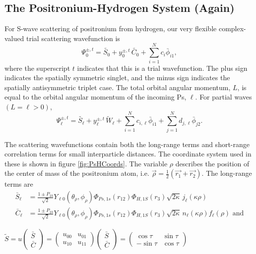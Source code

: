 \documentclass[preprint,showpacs,preprintnumbers,amsmath,amssymb]{revtex4}
\begin{document}
\subsection{The Positronium-Hydrogen System (Again)}
For S-wave scattering of positronium from hydrogen, our very flexible complex-valued trial scattering wavefunction is
\begin{equation}
\Psi_0^{\pm,t} = \widetilde{S_0} + y_0^{\pm,t} \, \widetilde{C_0} + \sum_{i=1}^N c_i \bar{\phi}_{i1},
\label{eq:TrialWave}
\end{equation}
where the superscript $t$ indicates that this is a trial wavefunction. The plus sign indicates the spatially symmetric singlet, and the minus sign indicates the spatially antisymmetric triplet case. The total orbital angular momentum, $L$, is equal to the orbital angular momentum of the incoming Ps, $\ell$. For partial waves $(L = \ell > 0)$,
\begin{equation}
\Psi_\ell^{\pm,t} = \widetilde{S_\ell} + y^{\pm,t}_\ell \, \widetilde{W}_\ell + \sum_{i=1}^N c_{i,\ell} \bar{\phi}_{i1} + \sum_{j=1}^N d_{j,\ell} \bar{\phi}_{j2}.
\label{eq:TrialWaveHigher}
\end{equation}

The scattering wavefunctions contain both the long-range terms and short-range correlation terms for small interparticle distances. The coordinate system used in these is shown in figure \ref{fig:PsHCoords}. The variable $\rho$ describes the position of the center of mass of the positronium atom, i.e. $\vec{\rho} = \frac{1}{2}\left(\vec{r_1} + \vec{r_2}\right)$. The long-range terms are
\begin{subequations}
\label{eq:SCPhiDef}
\begin{align}
\bar{S}_\ell &= \frac{1\pm P_{23}}{\sqrt{2}}Y_{\ell 0}(\theta_\rho,\phi_\rho)\Phi_{Ps,1s}\left(r_{12}\right) \Phi_{H,1S}\left(r_3\right) \sqrt{2\kappa} \,j_\ell\left(\kappa\rho\right) \label{eq:SBar} \\
\bar{C}_\ell &= \frac{1\pm P_{23}}{\sqrt{2}}Y_{\ell 0}(\theta_\rho,\phi_\rho)\Phi_{Ps,1s}\left(r_{12}\right) \Phi_{H,1S}\left(r_3\right) \sqrt{2\kappa} \,n_\ell\left(\kappa\rho\right) f_\ell(\rho) \text{ and}\label{eq:CBar}
\end{align}
\end{subequations}

$\widetilde{S} = u \left( \begin{smallmatrix}
\bar{S} \\ \bar{C}
\end{smallmatrix} \right) = \left( \begin{smallmatrix}
u_{00} & u_{01} \\  u_{10} & u_{11}
\end{smallmatrix} \right)
\left( \begin{smallmatrix}
\bar{S} \\ \bar{C}
\end{smallmatrix} \right) = 
\left( \begin{smallmatrix}
\cos \tau & \sin \tau \\  -\sin \tau & \cos \tau
\end{smallmatrix} \right)$
\end{document}

